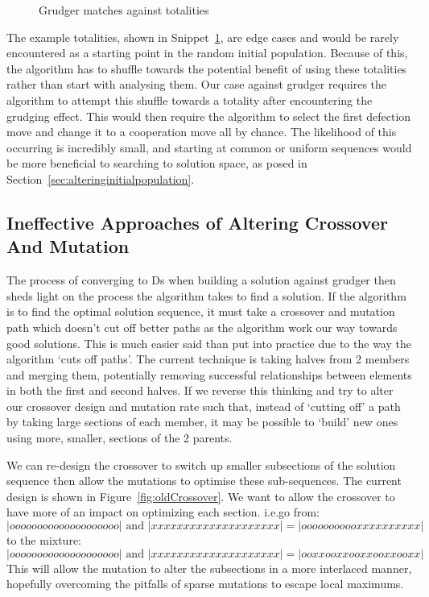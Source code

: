 \begin{figure}
    \inputminted{python}{code_snippets/grudgerTotalities.py}
    \caption{Grudger matches against totalities}\label{code:gudgerTotalities}
\end{figure}

The example totalities, shown in Snippet~\ref{code:gudgerTotalities}, are edge cases and would be rarely encountered as a starting point in the random initial population.
Because of this, the algorithm has to shuffle towards the potential benefit of using these totalities rather than start with analysing them.
Our case against grudger requires the algorithm to attempt this shuffle towards a totality after encountering the grudging effect.
This would then require the algorithm to select the first defection move and change it to a cooperation move all by chance.
The likelihood of this occurring is incredibly small, and starting at common or uniform sequences would be more beneficial to searching to solution space, as posed in Section~\ref{sec:alteringinitialpopulation}.

\subsection{Ineffective Approaches of Altering Crossover And Mutation}\label{subsec:ineffectiveApproachOfAlteringCrossoverAndMutation}
The process of converging to Ds when building a solution against grudger then sheds light on the process the algorithm takes to find a solution.
If the algorithm is to find the optimal solution sequence, it must take a crossover and mutation path which doesn't cut off better paths as the algorithm work our way towards good solutions.
This is much easier said than put into practice due to the way the algorithm `cuts off paths'.
The current technique is taking halves from 2 members and merging them, potentially removing successful relationships between elements in both the first and second halves.
If we reverse this thinking and try to alter our crossover design and mutation rate such that, instead of `cutting off' a path by taking large sections of each member, it may be possible to `build' new ones using more, smaller, sections of the 2 parents.

We can re-design the crossover to switch up smaller subsections of the solution sequence then allow the mutations to optimise these sub-sequences.
The current design is shown in Figure~\ref{fig:oldCrossover}.
We want to allow the crossover to have more of an impact on optimizing each section. 
i.e.go from:
\[|oooooooooooooooooooo| \text{ and } |xxxxxxxxxxxxxxxxxxxx|= |ooooooooooxxxxxxxxxx|\]
to the mixture:
\[|oooooooooooooooooooo|\text{ and } |xxxxxxxxxxxxxxxxxxxx|= |ooxxooxxooxxooxxooxx|\]
This will allow the mutation to alter the subsections in a more interlaced manner, hopefully overcoming the pitfalls of sparse mutations to escape local maximums.

